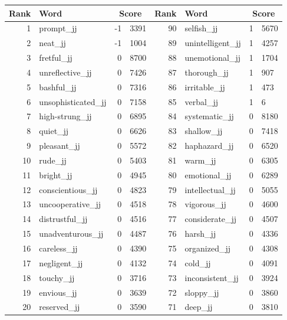 \begin{table}[tbp]
    \begin{tabular}{| rlr@{.}l | rlr@{.}l |}
    \hline
    \textbf{Rank} & \textbf{Word} & \multicolumn{2}{c|}{\textbf{Score}} & \textbf{Rank} & \textbf{Word} & \multicolumn{2}{c|}{\textbf{Score}} \\
    \hline
    1 & prompt\_jj & -1 & 3391    &    90 & selfish\_jj & 1 & 5670 \\
    2 & neat\_jj & -1 & 1004    &    89 & unintelligent\_jj & 1 & 4257 \\
    3 & fretful\_jj & 0 & 8700    &    88 & unemotional\_jj & 1 & 1704 \\
    4 & unreflective\_jj & 0 & 7426    &    87 & thorough\_jj & 1 & 907 \\
    5 & bashful\_jj & 0 & 7316    &    86 & irritable\_jj & 1 & 473 \\
    6 & unsophisticated\_jj & 0 & 7158    &    85 & verbal\_jj & 1 & 6 \\
    7 & high-strung\_jj & 0 & 6895    &    84 & systematic\_jj & 0 & 8180 \\
    8 & quiet\_jj & 0 & 6626    &    83 & shallow\_jj & 0 & 7418 \\
    9 & pleasant\_jj & 0 & 5572    &    82 & haphazard\_jj & 0 & 6520 \\
    10 & rude\_jj & 0 & 5403    &    81 & warm\_jj & 0 & 6305 \\
    11 & bright\_jj & 0 & 4945    &    80 & emotional\_jj & 0 & 6289 \\
    12 & conscientious\_jj & 0 & 4823    &    79 & intellectual\_jj & 0 & 5055 \\
    13 & uncooperative\_jj & 0 & 4518    &    78 & vigorous\_jj & 0 & 4600 \\
    14 & distrustful\_jj & 0 & 4516    &    77 & considerate\_jj & 0 & 4507 \\
    15 & unadventurous\_jj & 0 & 4487    &    76 & harsh\_jj & 0 & 4336 \\
    16 & careless\_jj & 0 & 4390    &    75 & organized\_jj & 0 & 4308 \\
    17 & negligent\_jj & 0 & 4132    &    74 & cold\_jj & 0 & 4091 \\
    18 & touchy\_jj & 0 & 3716    &    73 & inconsistent\_jj & 0 & 3924 \\
    19 & envious\_jj & 0 & 3639    &    72 & sloppy\_jj & 0 & 3860 \\
    20 & reserved\_jj & 0 & 3590    &    71 & deep\_jj & 0 & 3810 \\

\end{tabular}
\end{table}
